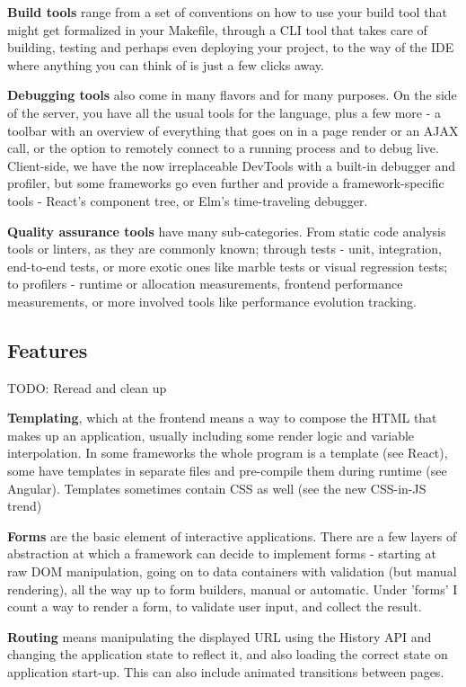 \documentclass[english,odsaz]{fitthesis}
\begin{document}
\textbf{Build tools} range from a set of conventions on how to use your build tool that
might get formalized in your Makefile, through a CLI tool that takes care of
building, testing and perhaps even deploying your project, to the way of the IDE
where anything you can think of is just a few clicks away.

\textbf{Debugging tools} also come in many flavors and for many purposes. On the side of
the server, you have all the usual tools for the language, plus a few more - a
toolbar with an overview of everything that goes on in a page render or an AJAX
call, or the option to remotely connect to a running process and to debug
live. Client-side, we have the now irreplaceable DevTools with a built-in
debugger and profiler, but some frameworks go even further and provide a
framework-specific tools - React's component tree, or Elm's time-traveling
debugger.

\textbf{Quality assurance tools} have many sub-categories. From static code analysis
tools or linters, as they are commonly known; through tests - unit, integration,
end-to-end tests, or more exotic ones like marble tests or visual regression
tests; to profilers - runtime or allocation measurements, frontend performance
measurements, or more involved tools like performance evolution tracking.

\subsection{Features}
\label{sec:org71e19d2}
TODO: Reread and clean up

\textbf{Templating}, which at the frontend means a way to compose the HTML that makes up
an application, usually including some render logic and variable
interpolation. In some frameworks the whole program is a template (see React),
some have templates in separate files and pre-compile them during runtime (see
Angular). Templates sometimes contain CSS as well (see the new CSS-in-JS trend)

\textbf{Forms} are the basic element of interactive applications. There are a few layers
of abstraction at which a framework can decide to implement forms - starting at
raw DOM manipulation, going on to data containers with validation (but manual
rendering), all the way up to form builders, manual or automatic. Under 'forms'
I count a way to render a form, to validate user input, and collect the result.

\textbf{Routing} means manipulating the displayed URL using the History API and changing
the application state to reflect it, and also loading the correct state on
application start-up. This can also include animated transitions between pages.
\end{document}
